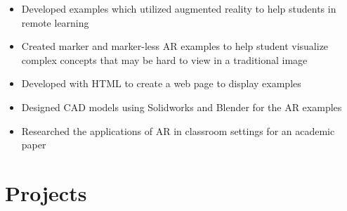 \documentclass[a4paper,20pt]{article}
\begin{document}
        \vspace{-18pt} 
        \hspace{-3pt}
        \begin{itemize}
            \item Developed examples which utilized augmented reality to help students in remote learning \vspace{-5pt}
            \item Created marker and marker-less AR examples to help student visualize complex concepts that may be hard to view in a traditional image \vspace{-5pt}
            \item Developed with HTML to create a web page to display examples \vspace{-5pt}
            \item Designed CAD models using Solidworks and Blender for the AR examples  \vspace{-5pt}
            \item Researched the applications of AR in classroom settings for an academic paper
        \end{itemize}        

\vspace{-8pt}
\section{Projects}
\end{document}

